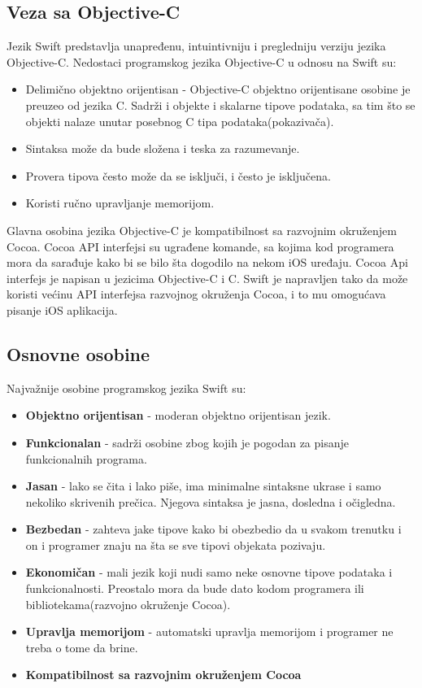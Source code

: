 \documentclass[a4paper]{article}
\begin{document}
\subsection{Veza sa Objective-C}
\label{subsec:podnaslovVeza}

Jezik Swift predstavlja unapređenu, intuintivniju i pregledniju verziju jezika Objective-C.
Nedostaci programskog jezika Objective-C u odnosu na Swift su:
\begin{itemize}
\item Delimično objektno orijentisan - Objective-C objektno orijentisane osobine je preuzeo od 		      jezika C. Sadrži i objekte i skalarne tipove podataka, sa tim što se objekti 
	  nalaze unutar posebnog C tipa podataka(pokazivača).
\item Sintaksa može da bude složena i teska za razumevanje.
\item Provera tipova često može da se isključi, i često je isključena.
\item Koristi ručno upravljanje memorijom.
\end{itemize}

Glavna osobina jezika Objective-C je kompatibilnost sa razvojnim okruženjem Cocoa.
Cocoa API interfejsi su ugrađene komande, sa kojima kod programera mora da sarađuje kako bi
se bilo šta dogodilo na nekom iOS uređaju. Cocoa Api interfejs je napisan u jezicima Objective-C i C. Swift je napravljen tako da može koristi većinu API interfejsa razvojnog okruženja Cocoa, i
to mu omogućava pisanje iOS aplikacija. 


\subsection{Osnovne osobine}
\label{subsec:podnaslovOsobine}

Najvažnije osobine programskog jezika Swift su:
\begin{itemize}
\item\textbf{Objektno orijentisan} - moderan objektno orijentisan jezik.
\item\textbf{Funkcionalan} - sadrži osobine zbog kojih je pogodan za pisanje funkcionalnih programa.
\item\textbf{Jasan} - lako se čita i lako piše, ima minimalne sintaksne ukrase i samo nekoliko skrivenih prečica. Njegova sintaksa je jasna, dosledna i očigledna.
\item\textbf{Bezbedan} - zahteva jake tipove kako bi obezbedio da u svakom trenutku i on i programer znaju na šta se sve tipovi objekata pozivaju.
\item\textbf{Ekonomičan} - mali jezik koji nudi samo neke osnovne tipove podataka i funkcionalnosti. Preostalo mora da bude dato kodom programera ili bibliotekama(razvojno okruženje Cocoa).
\item\textbf{Upravlja memorijom} - automatski upravlja memorijom i programer ne treba o tome da brine.
\item\textbf{Kompatibilnost sa razvojnim okruženjem Cocoa}
\end{itemize}
\end{document}
